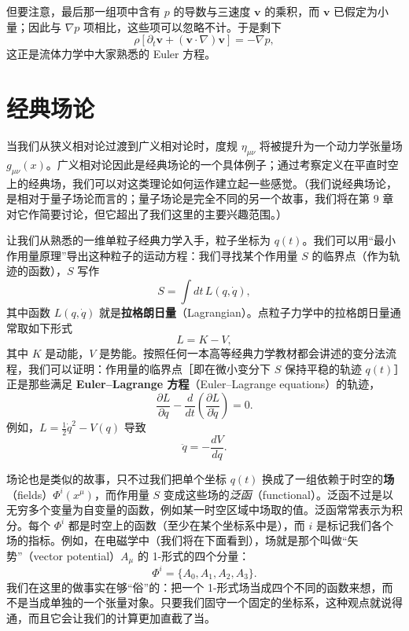 但要注意，最后那一组项中含有 $p$ 的导数与三速度 $\mathbf{v}$ 的乘积，而 $\mathbf{v}$ 已假定为小量；因此与 $\nabla p$ 项相比，这些项可以忽略不计。于是剩下
\begin{equation*}
\rho\left[\partial_t\mathbf{v} + (\mathbf{v}\cdot\nabla)\mathbf{v}\right] = -\nabla p,
\tag{1.125}
\end{equation*}
这正是流体力学中大家熟悉的 Euler 方程。

\section{经典场论}

当我们从狭义相对论过渡到广义相对论时，度规 $\eta_{\mu\nu}$ 将被提升为一个动力学张量场 $g_{\mu\nu}(x)$。广义相对论因此是经典场论的一个具体例子；通过考察定义在平直时空上的经典场，我们可以对这类理论如何运作建立起一些感觉。（我们说经典场论，是相对于量子场论而言的；量子场论是完全不同的另一个故事，我们将在第 9 章对它作简要讨论，但它超出了我们这里的主要兴趣范围。）

让我们从熟悉的一维单粒子经典力学入手，粒子坐标为 $q(t)$。我们可以用“最小作用量原理”导出这种粒子的运动方程：我们寻找某个作用量 $S$ 的临界点（作为轨迹的函数），$S$ 写作
\begin{equation*}
S = \int dt\, L(q, \dot{q}),
\tag{1.126}
\end{equation*}
其中函数 $L(q,\dot{q})$ 就是\textbf{拉格朗日量}（Lagrangian）。点粒子力学中的拉格朗日量通常取如下形式
\begin{equation*}
L = K - V,
\tag{1.127}
\end{equation*}
其中 $K$ 是动能，$V$ 是势能。按照任何一本高等经典力学教材都会讲述的变分法流程，我们可以证明：作用量的临界点［即在微小变分下 $S$ 保持平稳的轨迹 $q(t)$］正是那些满足 \textbf{Euler--Lagrange 方程}（Euler--Lagrange equations）的轨迹，
\begin{equation*}
\frac{\partial L}{\partial q} - \frac{d}{dt}\left(\frac{\partial L}{\partial \dot{q}}\right) = 0.
\tag{1.128}
\end{equation*}
例如，$L = \frac{1}{2}\dot{q}^{2} - V(q)$ 导致
\begin{equation*}
\ddot{q} = -\frac{dV}{dq}.
\tag{1.129}
\end{equation*}

场论也是类似的故事，只不过我们把单个坐标 $q(t)$ 换成了一组依赖于时空的\textbf{场}（fields）$\Phi^{i}(x^{\mu})$，而作用量 $S$ 变成这些场的\emph{泛函}（functional）。泛函不过是以无穷多个变量为自变量的函数，例如某一时空区域中场取的值。泛函常常表示为积分。每个 $\Phi^{i}$ 都是时空上的函数（至少在某个坐标系中是），而 $i$ 是标记我们各个场的指标。例如，在电磁学中（我们将在下面看到），场就是那个叫做“矢势”（vector potential）$A_{\mu}$ 的 1-形式的四个分量：
\begin{equation*}
\Phi^{i} = \{A_{0}, A_{1}, A_{2}, A_{3}\}.
\tag{1.130}
\end{equation*}
我们在这里的做事实在够“俗”的：把一个 1-形式场当成四个不同的函数来想，而不是当成单独的一个张量对象。只要我们固守一个固定的坐标系，这种观点就说得通，而且它会让我们的计算更加直截了当。

